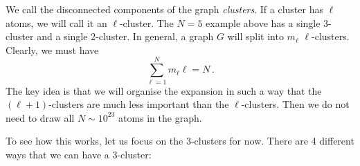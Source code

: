 \documentclass{article}
\theoremstyle{plain}\theoremheaderfont{\normalfont\bfseries}\theorembodyfont{\rmfamily}\theoremseparator{.}\newtheorem*{thm}{Theorem}\newtheorem*{law}{Law}\newtheorem*{pos}{Postulate}
\numberwithin{equation}{section}
\begin{document}
    We call the disconnected components of the graph \textit{clusters}. If a cluster has \(\ell\) atoms, we will call it an \(\ell\)-cluster. The \(N=5\) example above has a single 3-cluster and a single 2-cluster. In general, a graph \(G\) will split into \(m_\ell\) \(\ell\)-clusters. Clearly, we must have
    \begin{equation}\label{clusterconstrain}
        \sum_{\ell=1}^{N}m_\ell \ell=N\,.
    \end{equation}
    The key idea is that we will organise the expansion in such a way that the \((\ell+1)\)-clusters are much less important than the \(\ell\)-clusters. Then we do not need to draw all \(N\sim 10^{23}\) atoms in the graph.

    To see how this works, let us focus on the 3-clusters for now. There are 4 different ways that we can have a 3-cluster:
\end{document}
